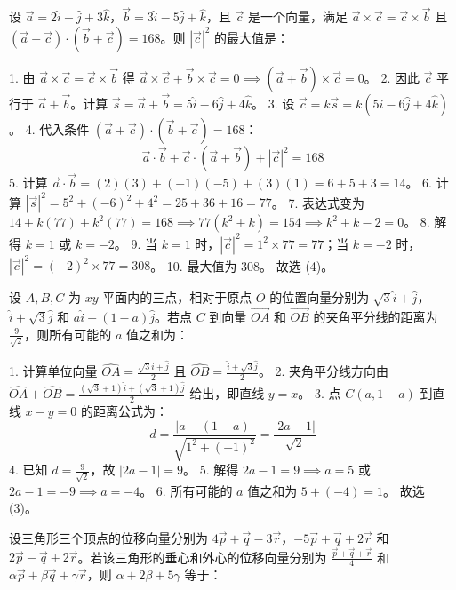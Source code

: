 \begin{questions}
\question
设 $\vec{a} = 2\hat{i} - \hat{j} + 3\hat{k}$，$\vec{b} = 3\hat{i} - 5\hat{j} + \hat{k}$，且 $\vec{c}$ 是一个向量，满足 $\vec{a} \times \vec{c} = \vec{c} \times \vec{b}$ 且 $(\vec{a} + \vec{c}) \cdot (\vec{b} + \vec{c}) = 168$。则 $|\vec{c}|^2$ 的最大值是：

\begin{solution}
1. 由 $\vec{a} \times \vec{c} = \vec{c} \times \vec{b}$ 得 $\vec{a} \times \vec{c} + \vec{b} \times \vec{c} = 0 \implies (\vec{a} + \vec{b}) \times \vec{c} = 0$。
2. 因此 $\vec{c}$ 平行于 $\vec{a} + \vec{b}$。计算 $\vec{s} = \vec{a} + \vec{b} = 5\hat{i} - 6\hat{j} + 4\hat{k}$。
3. 设 $\vec{c} = k \vec{s} = k(5\hat{i} - 6\hat{j} + 4\hat{k})$。
4. 代入条件 $(\vec{a} + \vec{c}) \cdot (\vec{b} + \vec{c}) = 168$：
\[
\vec{a} \cdot \vec{b} + \vec{c} \cdot (\vec{a} + \vec{b}) + |\vec{c}|^2 = 168
\]
5. 计算 $\vec{a} \cdot \vec{b} = (2)(3) + (-1)(-5) + (3)(1) = 6 + 5 + 3 = 14$。
6. 计算 $|\vec{s}|^2 = 5^2 + (-6)^2 + 4^2 = 25 + 36 + 16 = 77$。
7. 表达式变为 $14 + k(77) + k^2(77) = 168 \implies 77(k^2 + k) = 154 \implies k^2 + k - 2 = 0$。
8. 解得 $k = 1$ 或 $k = -2$。
9. 当 $k = 1$ 时，$|\vec{c}|^2 = 1^2 \times 77 = 77$；当 $k = -2$ 时，$|\vec{c}|^2 = (-2)^2 \times 77 = 308$。
10. 最大值为 308。
故选 (4)。
\end{solution}

\question
设 $A, B, C$ 为 $xy$ 平面内的三点，相对于原点 $O$ 的位置向量分别为 $\sqrt{3}\hat{i} + \hat{j}$，$\hat{i} + \sqrt{3}\hat{j}$ 和 $a\hat{i} + (1-a)\hat{j}$。若点 $C$ 到向量 $\vec{OA}$ 和 $\vec{OB}$ 的夹角平分线的距离为 $\frac{9}{\sqrt{2}}$，则所有可能的 $a$ 值之和为：

\begin{solution}
1. 计算单位向量 $\hat{OA} = \frac{\sqrt{3}\hat{i} + \hat{j}}{2}$ 且 $\hat{OB} = \frac{\hat{i} + \sqrt{3}\hat{j}}{2}$。
2. 夹角平分线方向由 $\hat{OA} + \hat{OB} = \frac{(\sqrt{3}+1)\hat{i} + (\sqrt{3}+1)\hat{j}}{2}$ 给出，即直线 $y = x$。
3. 点 $C(a, 1-a)$ 到直线 $x - y = 0$ 的距离公式为：
\[
d = \frac{|a - (1 - a)|}{\sqrt{1^2 + (-1)^2}} = \frac{|2a - 1|}{\sqrt{2}}
\]
4. 已知 $d = \frac{9}{\sqrt{2}}$，故 $|2a - 1| = 9$。
5. 解得 $2a - 1 = 9 \implies a = 5$ 或 $2a - 1 = -9 \implies a = -4$。
6. 所有可能的 $a$ 值之和为 $5 + (-4) = 1$。
故选 (3)。
\end{solution}

\question
设三角形三个顶点的位移向量分别为 $4\vec{p} + \vec{q} - 3\vec{r}$，$-5\vec{p} + \vec{q} + 2\vec{r}$ 和 $2\vec{p} - \vec{q} + 2\vec{r}$。若该三角形的垂心和外心的位移向量分别为 $\frac{\vec{p}+\vec{q}+\vec{r}}{4}$ 和 $\alpha\vec{p} + \beta\vec{q} + \gamma\vec{r}$，则 $\alpha + 2\beta + 5\gamma$ 等于：


\end{questions}
